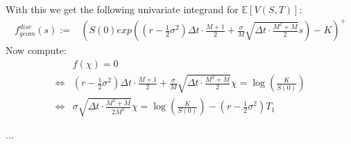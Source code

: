 \documentclass[a4paper,10pt]{article}
\begin{document}
With this we get the following univariate integrand for $\mathbb{E}\left[ V\left(S,T\right)\right]$:
\begin{align*}
 f_{geom}^{disc}\left(s\right):=&\left(S(0) exp\left(\left(r-\frac{1}{2}\sigma^2\right) \Delta t \cdot\frac{M+1}{2}+\frac{\sigma}{M}\sqrt{\Delta t\cdot\frac{M^2+M}{2}}s\right)-K\right)^+
\end{align*}
Now compute:
\begin{align*}
 &f\left(\chi\right)=0\\
 \Leftrightarrow& \left(r-\frac{1}{2}\sigma^2\right) \Delta t \cdot\frac{M+1}{2}+\frac{\sigma}{M}\sqrt{\Delta t\cdot\frac{M^2+M}{2}} \chi = \log \left(\frac{K}{S(0)}\right)\\
 \Leftrightarrow&  \sigma\sqrt{\Delta t\cdot\frac{M^2+M}{2M^2}} \chi = \log \left(\frac{K}{S(0)}\right)-\left(r-\frac{1}{2}\sigma^2\right)T_1
\end{align*}


...

\flushright{$\qed$}
\end{document}
